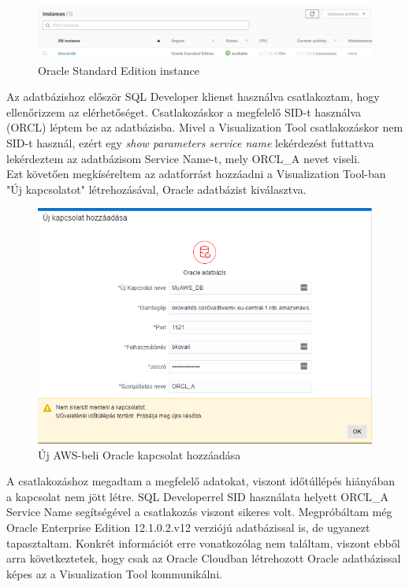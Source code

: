 \begin{figure}[h!]
	\centering
	\includegraphics[width=1\linewidth,height=0.2\linewidth]{bence_imgs/oracle_db}
	\caption{Oracle Standard Edition instance}
	\label{fig:oracledb}
\end{figure}
Az adatbázishoz először SQL Developer klienst használva csatlakoztam, hogy ellenőrizzem az elérhetőséget. Csatlakozáskor a megfelelő SID-t használva (ORCL) léptem be az adatbázisba. Mivel a Visualization Tool csatlakozáskor nem SID-t használ, ezért egy \textit{show parameters service name} lekérdezést futtattva lekérdeztem az adatbázisom Service Name-t, mely ORCL\_A nevet viseli. \\ Ezt követően megkíséreltem az adatforrást hozzáadni a Visualization Tool-ban "Új kapcsolatot" létrehozásával, Oracle adatbázist kiválasztva.
\begin{figure}[h!]
	\centering
	\includegraphics[width=0.9\linewidth,height=0.45\linewidth]{bence_imgs/add_connection_aws}
	\caption{Új AWS-beli Oracle kapcsolat hozzáadása}
	\label{fig:addconnectionaws}
\end{figure}
A csatlakozáshoz megadtam a megfelelő adatokat, viszont időtúllépés hiányában a kapcsolat nem jött létre. SQL Developerrel SID használata helyett ORCL\_A Service Name segítségével a csatlakozás viszont sikeres volt. Megpróbáltam még Oracle Enterprise Edition 12.1.0.2.v12 verziójú adatbázissal is, de ugyanezt tapasztaltam. Konkrét információt erre vonatkozólag nem találtam, viszont ebből arra következtetek, hogy csak az Oracle Cloudban létrehozott Oracle adatbázissal képes az a Visualization Tool kommunikálni.

\newpage
